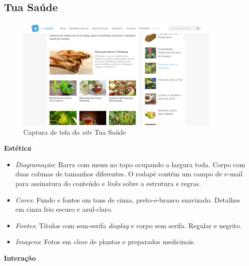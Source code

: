 \subsection{Tua Saúde}\label{tua-saude}

\begin{figure}
\centering
\caption{\label{fig-tuasaude}Captura de tela do \emph{site} Tua Saúde}
\includegraphics[width=0.9\textwidth]{images/similares/tuasaude.png}
\end{figure}

\textbf{Estética}

\begin{itemize}
\item
  \emph{Diagramação}: Barra com menu no topo ocupando a largura toda. Corpo com duas colunas de tamanhos diferentes. O rodapé contém um campo de e-mail para assinatura do conteúdo e \emph{links} sobre a estrutura e regras.
\item
  \emph{Cores}: Fundo e fontes em tons de cinza, preto-e-branco suavizado. Detalhes em cinza frio escuro e azul-claro.
\item
  \emph{Fontes}: Títulos com sem-serifa \emph{display} e corpo sem serifa. Regular e negrito.
\item
  \emph{Imagens}: Fotos em \emph{close} de plantas e preparados medicinais.
\end{itemize}

\textbf{Interação}

